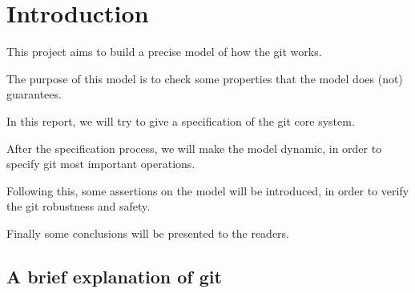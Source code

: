 \section{Introduction}

This project aims to build a precise model of how the git works. \par
The purpose of this model is to check some properties that the model does
(not) guarantees.\par
In this report, we will try to give a specification
of the git core system. \par
After the specification process, we will make the
model dynamic, in order to specify git most important operations. \par
Following this, some assertions on the model will be
introduced, in order
to verify the git robustness and safety. \par
Finally some conclusions will be presented to the readers.

\subsection{A brief explanation of git}

